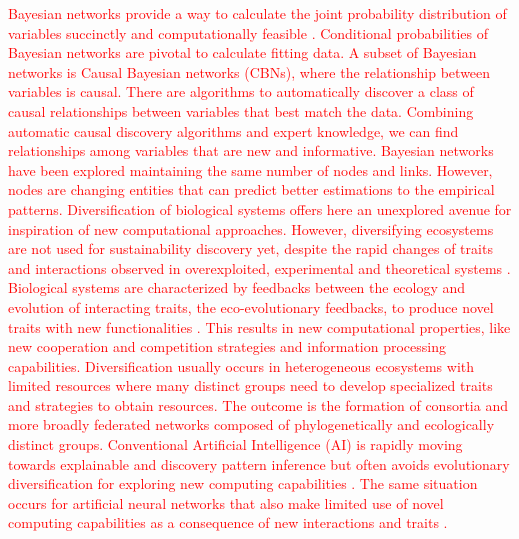 \documentclass[12pt,a4paper]{article}
\begin{document}
\textcolor{red}{Bayesian networks provide a way to calculate the joint probability distribution of variables succinctly and computationally feasible \citep{pearl2011bayesian}. Conditional probabilities of Bayesian networks are pivotal to calculate fitting data. A subset of Bayesian networks is Causal Bayesian networks (CBNs), where the relationship between variables is causal. There are algorithms to automatically discover a class of causal relationships between variables that best match the data. Combining automatic causal discovery algorithms and expert knowledge, we can find relationships among variables that are new and informative. Bayesian networks have been explored maintaining the same number of nodes and links. However, nodes are changing entities that can predict better estimations to the empirical patterns. Diversification of biological systems offers here an unexplored avenue for inspiration of new computational approaches. However, diversifying ecosystems are not used for sustainability discovery yet, despite the rapid changes of traits and interactions observed in overexploited, experimental and theoretical systems \citep{Hairston2005, Walsh2006, Fussmann2007, Trugman8532}. Biological systems are characterized by feedbacks between the ecology and evolution of interacting traits, the eco-evolutionary feedbacks, to produce novel traits with new functionalities \citep{Govaertetal2019}. This results in new computational properties, like new cooperation and competition strategies and information processing capabilities. Diversification usually occurs in heterogeneous ecosystems with limited resources where many distinct groups need to develop specialized traits and strategies to obtain resources. The outcome is the formation of consortia and more broadly federated networks composed of phylogenetically and ecologically distinct groups. Conventional Artificial Intelligence (AI) is rapidly moving towards explainable and discovery pattern inference \citep{Iten2020a} but often avoids evolutionary diversification for exploring new computing capabilities \citep{Real2020}. The same situation occurs for artificial neural networks that also make limited use of novel computing capabilities as a consequence of new interactions and traits \citep{Schmidhuber:2015}.}
\end{document}
